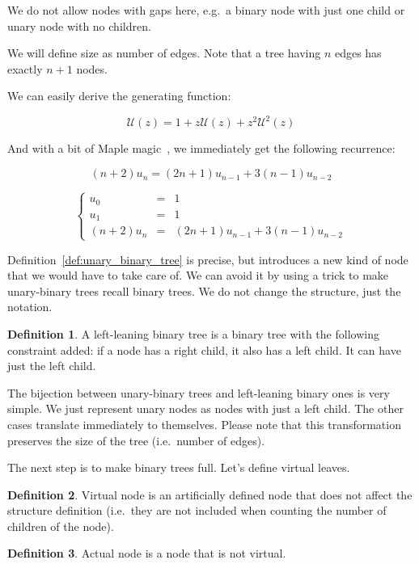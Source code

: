 \documentclass[final]{article}
\theoremstyle{definition}
\newtheorem{definition}{Definition}[subsection]
\theoremstyle{definition}
\theoremstyle{remark}
\newcommand{\gf}[1]{\ensuremath{\mathcal{#1}}}
\begin{document}
We do not allow nodes with gaps here, e.g.\ a binary node with just one child or unary node with no children.

We will define size as number of edges. Note that a tree having \(n\) edges has exactly \(n + 1\) nodes.

We can easily derive the generating function:

\[\gf{U}(z) = 1 + z\gf{U}(z) + z^2 \gf{U}^2(z)\]

And with a bit of Maple magic~\cite{gfun}, we immediately get the following recurrence:

\[(n + 2)u_{n} = (2n + 1)u_{n - 1} + 3(n - 1)u_{n - 2}\]

\[\left\{\begin{array}{rcl}
            u_0 &=& 1\\
            u_1 &=& 1\\
            (n + 2)u_{n} &=& (2n + 1)u_{n - 1} + 3(n - 1)u_{n - 2}
\end{array}\right.\]

Definition~\ref{def:unary_binary_tree} is precise, but introduces a new kind of node that we would have to take care of. We can avoid it by using a trick to make unary-binary trees recall binary trees. We do not change the structure, just the notation.

\begin{definition}
    \label{def:unary_binary_2}
    A left-leaning binary tree is a binary tree with the following constraint added: if a node has a right child, it also has a left child. It can have just the left child.
\end{definition}

The bijection between unary-binary trees and left-leaning binary ones is very simple. We just represent unary nodes as nodes with just a left child. The other cases translate immediately to themselves. Please note that this transformation preserves the size of the tree (i.e.~number of edges).

The next step is to make binary trees full. Let's define virtual leaves.

\begin{definition}
    Virtual node is an artificially defined node that does not affect the structure definition (i.e.\ they are not included when counting the number of children of the node).
\end{definition}

\begin{definition}
    Actual node is a node that is not virtual.
\end{definition}
\end{document}
